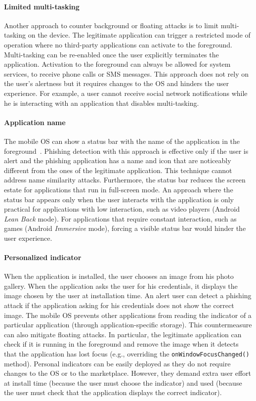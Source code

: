 \paragraph{Limited multi-tasking} Another approach to counter background or
floating attacks is to limit multi-tasking on the device. The legitimate
application can trigger a restricted mode of operation where no third-party
applications can activate to the foreground. Multi-tasking can be re-enabled
once the user explicitly terminates the application. Activation to the
foreground can always be allowed for system services, to receive phone calls or
SMS messages. This approach does not rely on the user's alertness but it
requires changes to the OS and hinders the user experience. For example, a user
cannot receive social network notifications while he is interacting with an
application that disables multi-tasking.

\paragraph{Application name}
The mobile OS can show a status bar with the name
of the application in the foreground~\cite{selhorst10trust,bianchi15sp}.
Phishing detection with this approach is effective only if the user is alert and the phishing
application has a name and icon that are noticeably different from the ones of
the legitimate application. This technique cannot address name similarity attacks.
Furthermore, the status bar reduces the screen estate for applications that run in full-screen mode. An approach where the
status bar appears only when the user interacts with the application is only
practical for applications with low interaction, such
as video players (Android \emph{Lean Back} mode). For applications that require
constant interaction, such as games (Android \emph{Immersive} mode),
forcing a visible status bar would hinder the user experience.

\paragraph{Personalized indicator} When the application is installed, the user
chooses an image from his photo gallery. When the application asks the user for
his credentials, it displays the image chosen by the user at installation time.
An alert user can detect a phishing attack if the application asking for his
credentials does not show the correct image. The mobile OS prevents other
applications from reading the indicator of a particular application (through
application-specific storage). This countermeasure can also mitigate floating
attacks. In particular, the legitimate application can check if it is running
in the foreground and remove the image when it detects that the application has
lost focus (e.g., overriding the \texttt{onWindowFocusChanged()} method).
Personal indicators can be easily deployed as they do not require changes to
the OS or to the marketplace. However, they demand extra user effort at install
time (because the user must choose the indicator) and used (because the user
must check that the application displays the correct indicator).

